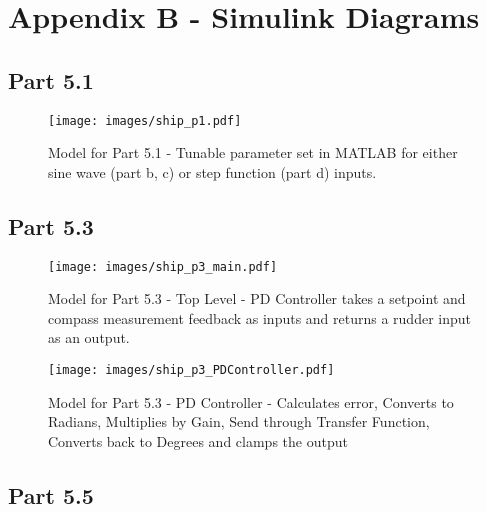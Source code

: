 \section{Appendix B - Simulink Diagrams}
\begin{subappendices}
\subsection{Part 5.1}
\begin{figure}
\caption{Model for Part 5.1 - Tunable parameter set in MATLAB for either sine wave (part b, c) or step function (part d) inputs.}
	\centering
		\texttt{[image: images/ship\_p1.pdf]}
	\label{fig:ship_p1}
\end{figure}


\subsection{Part 5.3}
\begin{figure}
\caption{Model for Part 5.3 - Top Level - PD Controller takes a setpoint and compass measurement feedback as inputs and returns a rudder input as an output.}
	\centering
		\texttt{[image: images/ship\_p3\_main.pdf]}
	\label{fig:ship_p3_main}
\end{figure}


\begin{figure}
\caption{Model for Part 5.3 - PD Controller - Calculates error, Converts to Radians, Multiplies by Gain, Send through Transfer Function, Converts back to Degrees and clamps the output}
	\centering
		\texttt{[image: images/ship\_p3\_PDController.pdf]}
	\label{fig:ship_p3_PDController}
\end{figure}



\subsection{Part 5.5}

\end{subappendices}
